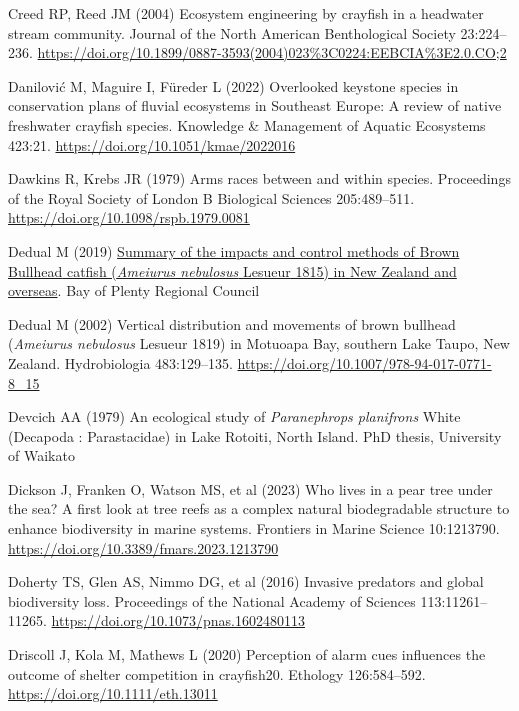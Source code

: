 \documentclass[
  12pt,
  a4paper,
]{scrbook}
\newlength{\cslhangindent}
\newenvironment{CSLReferences}[2] %
 {\begin{list}{}{%
  \setlength{\itemindent}{0pt}
  \setlength{\leftmargin}{0pt}
  \setlength{\parsep}{0pt}
  \ifodd #1
   \setlength{\leftmargin}{\cslhangindent}
   \setlength{\itemindent}{-1\cslhangindent}
  \fi
  \setlength{\itemsep}{#2\baselineskip}}}
 {\end{list}}
\begin{document}
\begin{CSLReferences}{1}{1}
Creed RP, Reed JM (2004) Ecosystem engineering by crayfish in a
headwater stream community. Journal of the North American Benthological
Society 23:224--236.
\url{https://doi.org/10.1899/0887-3593(2004)023\%3C0224:EEBCIA\%3E2.0.CO;2}

Danilović M, Maguire I, Füreder L (2022) Overlooked keystone species in
conservation plans of fluvial ecosystems in {Southeast Europe}: A review
of native freshwater crayfish species. Knowledge \& Management of
Aquatic Ecosystems 423:21. \url{https://doi.org/10.1051/kmae/2022016}

Dawkins R, Krebs JR (1979) Arms races between and within species.
Proceedings of the Royal Society of London B Biological Sciences
205:489--511. \url{https://doi.org/10.1098/rspb.1979.0081}

Dedual M (2019)
\href{https://atlas.boprc.govt.nz/api/v1/edms/document/A3591759/content}{Summary
of the impacts and control methods of {Brown Bullhead} catfish
({\emph{Ameiurus nebulosus}} {Lesueur} 1815) in {New Zealand} and
overseas}. {Bay of Plenty} Regional Council

Dedual M (2002) Vertical distribution and movements of brown bullhead
({\emph{Ameiurus nebulosus}} {Lesueur} 1819) in {Motuoapa Bay}, southern
{Lake Taupo}, {New Zealand}. Hydrobiologia 483:129--135.
\url{https://doi.org/10.1007/978-94-017-0771-8_15}

Devcich AA (1979) An ecological study of {\emph{Paranephrops
planifrons}} {White} ({Decapoda} : {Parastacidae}) in {Lake Rotoiti},
{North Island}. PhD thesis, University of Waikato

Dickson J, Franken O, Watson MS, et al (2023) Who lives in a pear tree
under the sea? A first look at tree reefs as a complex natural
biodegradable structure to enhance biodiversity in marine systems.
Frontiers in Marine Science 10:1213790.
\url{https://doi.org/10.3389/fmars.2023.1213790}

Doherty TS, Glen AS, Nimmo DG, et al (2016) Invasive predators and
global biodiversity loss. Proceedings of the National Academy of
Sciences 113:11261--11265. \url{https://doi.org/10.1073/pnas.1602480113}

Driscoll J, Kola M, Mathews L (2020) Perception of alarm cues influences
the outcome of shelter competition in crayfish20. Ethology 126:584--592.
\url{https://doi.org/10.1111/eth.13011}


\end{CSLReferences}
\end{document}
